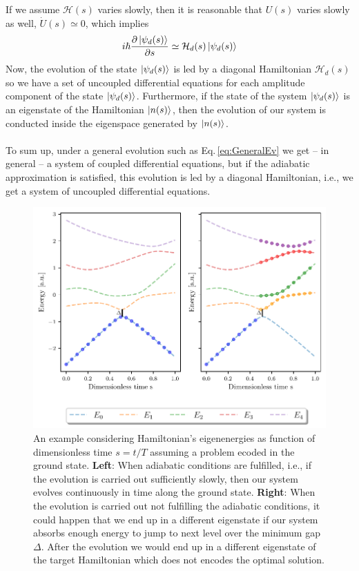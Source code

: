 If we assume $\mathcal{H}(s)$ varies slowly, then it is reasonable that $U(s)$ varies slowly as well, $\dot{U}(s) \simeq 0$, which implies
\begin{equation}
    i\hbar  \frac{\partial \ket{\psi_{d}(s)}}{\partial s} \simeq \mathcal{H}_{d}(s)\ket{\psi_{d}(s)}
\end{equation}
Now, the evolution of the state $\ket{\psi_{d}(s)}$ is led by a diagonal Hamiltonian $\mathcal{H}_{d}(s)$ so we have a set of uncoupled differential equations for each amplitude component of the state $\ket{\psi_{d}(s)}$. Furthermore, if the state of the system $\ket{\psi_{d}(s)}$ is an eigenstate of the Hamiltonian $\ket{n(s)}$, then the evolution of our system is conducted inside the eigenspace generated by $\ket{n(s)}$.\\\\
To sum up, under a general evolution such as Eq.\,\eqref{eq:GeneralEv} we get -- in general -- a system of coupled differential equations, but if the adiabatic approximation is satisfied, this evolution is led by a diagonal Hamiltonian, i.e., we get a system of uncoupled differential equations.
\begin{figure}[H]
    \centering
    \includegraphics[width=\textwidth]{Figures/Eigenenergies.pdf}
    \caption{An example considering Hamiltonian's eigenenergies as function of dimensionless time $s=t/T$ assuming a problem ecoded in the ground state. \textbf{Left}: When adiabatic conditions are fulfilled, i.e., if the evolution is carried out sufficiently slowly, then our system evolves continuously in time along the ground state. \textbf{Right}: When the evolution is carried out not fulfilling the adiabatic conditions, it could happen that we end up in a different eigenstate if our system absorbs enough energy to jump to next level over the minimum gap $\Delta$. After the evolution we would end up in a different eigenstate of the target Hamiltonian which does not encodes the optimal solution.}
    \label{fig:Eigenenergies}
\end{figure}
